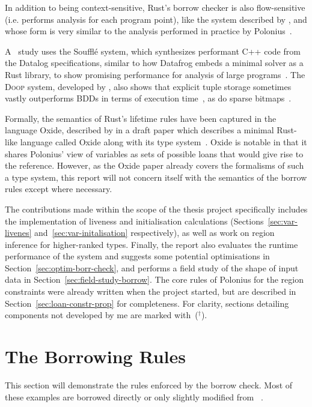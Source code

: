 \documentclass[11pt,a4paper,twoside,openany]{report}
\newcommand{\notmine}[0] {$^\dagger$}
\begin{document}
In addition to being context-sensitive, Rust's borrow checker is also
flow-sensitive (i.e. performs analysis for each program point), like the system
described by \citeauthor{Hardekopf:2009:SFP:1480881.1480911}, and whose form is
very similar to the analysis performed in practice by
Polonius~\cite{Hardekopf:2009:SFP:1480881.1480911}.

A \citeyear{scholz_fast_2016}~study uses the Souffl{\'e} system, which
synthesizes performant C++ code from the Datalog specifications, similar to how
Datafrog embeds a minimal solver as a Rust library, to show promising
performance for analysis of large programs~\cite{scholz_fast_2016}. The
\textsc{Doop} system, developed by \citeauthor{smaragdakis_using_2010}, also
shows that explicit tuple storage sometimes vastly outperforms BDDs in terms of
execution time~\cite{smaragdakis_using_2010}, as do sparse
bitmaps~\cite{Hardekopf:2007:AGF:1250734.1250767}.

Formally, the semantics of Rust's lifetime rules have been captured in the
language Oxide, described by \citeauthor{weiss_oxide:_2019} in a draft paper
which describes a minimal Rust-like language called Oxide along with its type
system~\cite{weiss_oxide:_2019}. Oxide is notable in that it shares
Polonius' view of variables as sets of possible loans that would give rise to
the reference. However, as the Oxide paper already covers the formalisms of such
a type system, this report will not concern itself with the semantics of the
borrow rules except where necessary.

The contributions made within the scope of the thesis project specifically
includes the implementation of liveness and initialisation calculations
(Sections~\ref{sec:var-livenes} and~\ref{sec:var-initalisation} respectively),
as well as work on region inference for higher-ranked types. Finally, the report
also evaluates the runtime performance of the system and suggests some potential
optimisations in Section~\ref{sec:optim-borr-check}, and performs a field study
of the shape of input data in Section~\ref{sec:field-study-borrow}. The core
rules of Polonius for the region constraints were already written when the
project started, but are described in Section~\ref{sec:loan-constr-prop} for
completeness. For clarity, sections detailing components not developed by me are
marked with~(\notmine{}).

\section{The Borrowing Rules}\label{sec:borrowing-rules}
This section will demonstrate the rules enforced by the borrow check. Most of
these examples are borrowed directly or only slightly modified from
\citeauthor{weiss_oxide:_2019}~\cite{weiss_oxide:_2019}.
\end{document}
